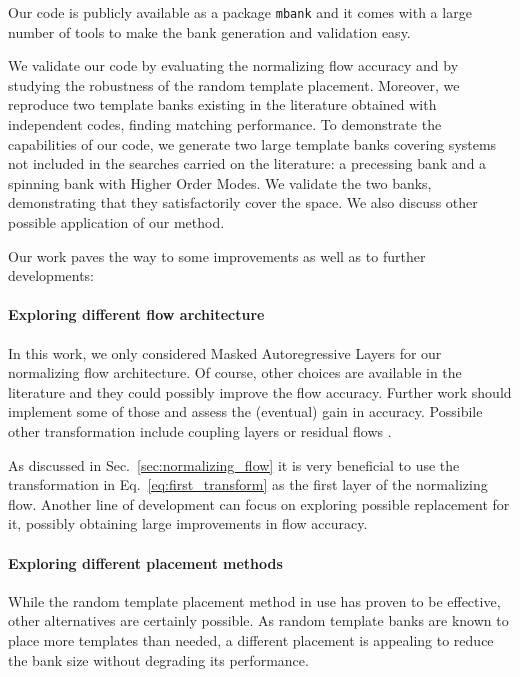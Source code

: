 \documentclass[twocolumn,showpacs,preprintnumbers,nofootinbib,prd,
superscriptaddress,10pt]{revtex4-2}
\begin{document}
Our code is publicly available as a package \texttt{mbank} and it comes with a large number of tools to make the bank generation and validation easy.

We validate our code by evaluating the normalizing flow accuracy and by studying the robustness of the random template placement.
Moreover, we reproduce two template banks existing in the literature obtained with independent codes, finding matching performance.
To demonstrate the capabilities of our code, we generate two large template banks covering systems not included in the searches carried on the literature: a precessing bank and a spinning bank with Higher Order Modes. We validate the two banks, demonstrating that they satisfactorily cover the space.
We also discuss other possible application of our method.

Our work paves the way to some improvements as well as to further developments:

\paragraph{Exploring different flow architecture}

In this work, we only considered Masked Autoregressive Layers for our normalizing flow architecture. Of course, other choices are available in the literature and they could possibly improve the flow accuracy. Further work should implement some of those and assess the (eventual) gain in accuracy.
Possibile other transformation include coupling layers \cite{Dinh2014NICENI,Dinh2016DensityEU} or residual flows \cite{NIPS1999_e6384711, Behrmann2018InvertibleRN}.

As discussed in Sec.~\ref{sec:normalizing_flow} it is very beneficial to use the transformation in Eq.~\eqref{eq:first_transform} as the first layer of the normalizing flow. Another line of development can focus on exploring possible replacement for it, possibly obtaining large improvements in flow accuracy.

\paragraph{Exploring different placement methods}

While the random template placement method in use has proven to be effective, other alternatives are certainly possible. As random template banks are known to place more templates than needed, a different placement is appealing to reduce the bank size without degrading its performance.
\end{document}
